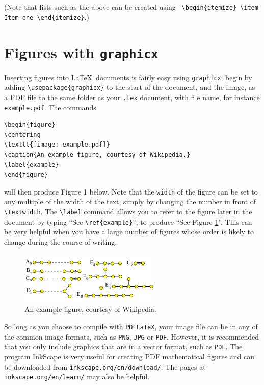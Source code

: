\documentclass[10pt]{article}
\begin{document}
(Note that lists such as the above can be created using \verb$ \begin{itemize} \item Item one \end{itemize}$.)

\section{Figures with \texttt{graphicx}}

Inserting figures into \LaTeX\ documents is fairly easy using \texttt{graphicx}; begin by adding \verb$\usepackage{graphicx}$ to the start of the document, and the image, as a PDF file to the same folder as your \verb$.tex$ document, with file name, for instance \verb$example.pdf$. The commands
\begin{verbatim}
\begin{figure}
\centering
\texttt{[image: example.pdf]}
\caption{An example figure, courtesy of Wikipedia.}
\label{example}
\end{figure}
\end{verbatim}
will then produce Figure 1 below. Note that the \verb$width$ of the figure can be set to any multiple of the width of the text, simply by changing the number in front of \verb$\textwidth$. The \verb$\label$ command allows you to refer to the figure later in the document by typing ``See \verb$\ref{example}$'', to produce ``See Figure \ref{example}''. This can be very helpful when you have a large number of figures whose order is likely to change during the course of writing.
\paragraph{}

\begin{figure}[h]
\centering
\includegraphics[width=0.6\textwidth]{example.png}
\caption{An example figure, courtesy of Wikipedia.}
\label{example}
\end{figure}

So long as you choose to compile with \texttt{PDFLaTeX}, your image file can be in any of the common image formats, such as \texttt{PNG}, \texttt{JPG} or \texttt{PDF}. However, it is recommended that you only include graphics that are in a vector format, such as \texttt{PDF}. The program InkScape is very useful for creating PDF mathematical figures and can be downloaded from \verb$inkscape.org/en/download/$. The pages at \verb$inkscape.org/en/learn/$ may also be helpful.
\end{document}
